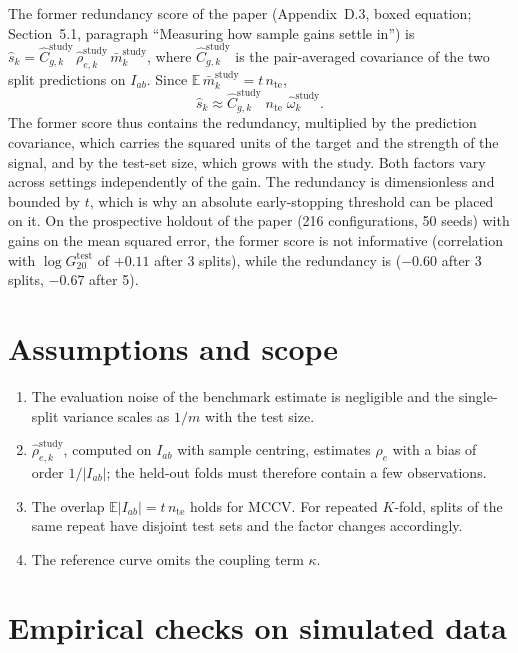 \documentclass[11pt]{article}
\begin{document}
The former redundancy score of the paper (Appendix~D.3, boxed equation; Section~5.1, paragraph
``Measuring how sample gains settle in'') is
$\widehat s_k = \widehat C^{\mathrm{study}}_{g,k}\,
\widehat\rho^{\mathrm{study}}_{e,k}\, \bar m^{\mathrm{study}}_k$, where
$\widehat C^{\mathrm{study}}_{g,k}$ is the pair-averaged covariance of the two split
predictions on $I_{ab}$. Since $\mathbb{E}\,\bar m^{\mathrm{study}}_k = t\, n_{\text{te}}$,
\begin{equation}
  \widehat s_k \approx \widehat C^{\mathrm{study}}_{g,k}\; n_{\text{te}}\; \widehat\omega^{\mathrm{study}}_k .
\end{equation}
The former score thus contains the redundancy, multiplied by the prediction covariance, which
carries the squared units of the target and the strength of the signal, and by the test-set
size, which grows with the study. Both factors vary across settings independently of the gain.
The redundancy is dimensionless and bounded by $t$, which is why an absolute early-stopping
threshold can be placed on it. On the prospective holdout of the paper (216 configurations,
50 seeds) with gains on the mean squared error, the former score is not informative (correlation
with $\log G^{\text{test}}_{20}$ of $+0.11$ after 3 splits), while the redundancy is
($-0.60$ after 3 splits, $-0.67$ after 5).

\section{Assumptions and scope}

\begin{enumerate}
  \item The evaluation noise of the benchmark estimate is negligible and the single-split
        variance scales as $1/m$ with the test size.
  \item $\widehat\rho^{\mathrm{study}}_{e,k}$, computed on $I_{ab}$ with sample centring,
        estimates $\rho_e$ with a bias of order $1/|I_{ab}|$; the held-out folds must therefore
        contain a few observations.
  \item The overlap $\mathbb{E}|I_{ab}| = t\,n_{\text{te}}$ holds for MCCV. For repeated
        $K$-fold, splits of the same repeat have disjoint test sets and the factor changes
        accordingly.
  \item The reference curve omits the coupling term $\kappa$.
\end{enumerate}

\section{Empirical checks on simulated data}
\end{document}
